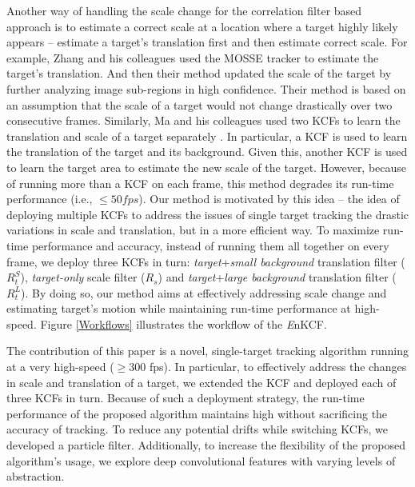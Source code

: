 \documentclass[10pt,twocolumn,letterpaper]{article}
\begin{document}
Another way of handling the scale change for the correlation filter
based approach is to estimate a correct scale at a location where a
target highly likely appears \cite{zhang2014fast} -- estimate a
target's translation first and then estimate correct scale. For
example, Zhang and his colleagues used the MOSSE tracker
\cite{bolme2010visual} to estimate the target's translation. And then
their method updated the scale of the target by further analyzing
image sub-regions in high confidence. Their method is based on an
assumption that the scale of a target would not change drastically
over two consecutive frames. Similarly, Ma and his colleagues used two
KCFs to learn the translation and scale of a target separately
\cite{ma2015long}. In particular, a KCF is used to learn the
translation of the target and its background. Given this, another KCF
is used to learn the target area to estimate the new scale of the
target. However, because of running more than a KCF on each frame,
this method degrades its run-time performance (i.e., $\leq 50
fps$). Our method is motivated by this idea -- the idea of deploying
multiple KCFs to address the issues of single target tracking the
drastic variations in scale and translation, but in a more efficient
way. To maximize run-time performance and accuracy, instead of running
them all together on every frame, we deploy three KCFs in turn:
\textit{target}+\textit{small background} translation filter
($R_{t}^{S}$), \textit{target-only} scale filter ($R_{s}$) and
\textit{target}+\textit{large background} translation filter
($R_{t}^{L}$). By doing so, our method aims at effectively addressing
scale change and estimating target's motion while maintaining run-time
performance at high-speed. Figure \ref{Workflows} illustrates the
workflow of the {\it E}nKCF.

The contribution of this paper is a novel, single-target tracking
algorithm running at a very high-speed ($\geq300$ fps). In particular,
to effectively address the changes in scale and translation of a
target, we extended the KCF and deployed each of three KCFs in
turn. Because of such a deployment strategy, the run-time performance
of the proposed algorithm maintains high without sacrificing the
accuracy of tracking. To reduce any potential drifts while switching
KCFs, we developed a particle filter. Additionally, to increase the
flexibility of the proposed algorithm's usage, we explore deep
convolutional features with varying levels of abstraction.

\end{document}
